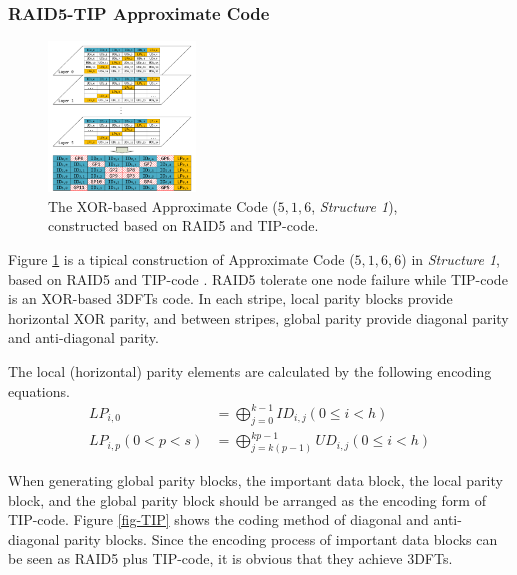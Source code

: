 \documentclass[sigconf]{acmart}
\begin{document}
\subsubsection{RAID5-TIP Approximate Code}
\begin{figure}[h]
\centering
\includegraphics[width=0.35\textwidth]{photo/AP-TIP-v2.pdf}
\caption{The XOR-based Approximate Code ($5,1,6$, \emph{Structure 1}), constructed based on RAID5 and TIP-code.}
\label{fig-ap-TIP}
\end{figure}

Figure \ref{fig-ap-TIP} is a tipical construction of Approximate Code ($5,1,6,6$) in \emph{Structure 1}, based on RAID5 and TIP-code \cite{zhang2015tip}. RAID5 tolerate one node failure while TIP-code is an XOR-based 3DFTs code. In each stripe, local parity blocks provide horizontal XOR parity, and between stripes, global parity provide diagonal parity and anti-diagonal parity. 

The local (horizontal) parity elements are calculated by the following encoding equations.
\begin{align}
    LP_{i,0} &= \bigoplus_{j=0}^{k-1} ID_{i,j} (0 \leqslant i < h)\\
    LP_{i,p}(0<p<s) &= \bigoplus_{j=k(p-1)}^{kp-1} UD_{i,j} (0 \leqslant i < h)
\end{align}

When generating global parity blocks, the important data block, the local parity block, and the global parity block should be arranged as the encoding form of TIP-code. Figure \ref{fig-TIP} shows the coding method of diagonal and anti-diagonal parity blocks.
Since the encoding process of important data blocks can be seen as RAID5 plus TIP-code, it is obvious that they achieve 3DFTs.
\end{document}
